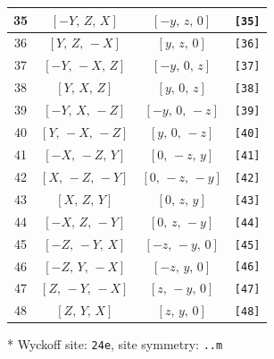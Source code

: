 \documentclass[fleqn,8pt]{jsarticle}
\begin{document}
\begin{longtable}{cccc}
35 & $\left[ - Y,\, Z,\, X \right]$ & $\left[ - y,\, z,\, 0 \right]$ & {\tt [35]} \\ \hline
36 & $\left[ Y,\, Z,\, - X \right]$ & $\left[ y,\, z,\, 0 \right]$ & {\tt [36]} \\ \hline
37 & $\left[ - Y,\, - X,\, Z \right]$ & $\left[ - y,\, 0,\, z \right]$ & {\tt [37]} \\ \hline
38 & $\left[ Y,\, X,\, Z \right]$ & $\left[ y,\, 0,\, z \right]$ & {\tt [38]} \\ \hline
39 & $\left[ - Y,\, X,\, - Z \right]$ & $\left[ - y,\, 0,\, - z \right]$ & {\tt [39]} \\ \hline
40 & $\left[ Y,\, - X,\, - Z \right]$ & $\left[ y,\, 0,\, - z \right]$ & {\tt [40]} \\ \hline
41 & $\left[ - X,\, - Z,\, Y \right]$ & $\left[ 0,\, - z,\, y \right]$ & {\tt [41]} \\ \hline
42 & $\left[ X,\, - Z,\, - Y \right]$ & $\left[ 0,\, - z,\, - y \right]$ & {\tt [42]} \\ \hline
43 & $\left[ X,\, Z,\, Y \right]$ & $\left[ 0,\, z,\, y \right]$ & {\tt [43]} \\ \hline
44 & $\left[ - X,\, Z,\, - Y \right]$ & $\left[ 0,\, z,\, - y \right]$ & {\tt [44]} \\ \hline
45 & $\left[ - Z,\, - Y,\, X \right]$ & $\left[ - z,\, - y,\, 0 \right]$ & {\tt [45]} \\ \hline
46 & $\left[ - Z,\, Y,\, - X \right]$ & $\left[ - z,\, y,\, 0 \right]$ & {\tt [46]} \\ \hline
47 & $\left[ Z,\, - Y,\, - X \right]$ & $\left[ z,\, - y,\, 0 \right]$ & {\tt [47]} \\ \hline
48 & $\left[ Z,\, Y,\, X \right]$ & $\left[ z,\, y,\, 0 \right]$ & {\tt [48]} \\
\end{longtable}
* Wyckoff site: {\tt 24e}, site symmetry: {\tt ..m}
\renewcommand{\arraystretch}{1.2}
\end{document}
